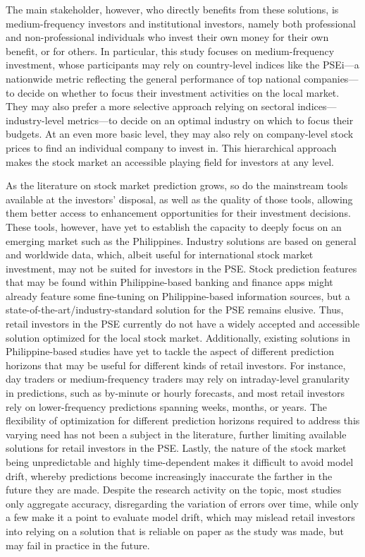 \documentclass[stu,floatsintext]{apa7}
\begin{document}
The main stakeholder, however, who directly benefits from these solutions, is medium-frequency investors and institutional investors, namely both professional and non-professional individuals who invest their own money for their own benefit, or for others. In particular, this study focuses on medium-frequency investment, whose participants may rely on country-level indices like the PSEi—a nationwide metric reflecting the general performance of top national companies—to decide on whether to focus their investment activities on the local market. They may also prefer a more selective approach relying on sectoral indices—industry-level metrics—to decide on an optimal industry on which to focus their budgets. At an even more basic level, they may also rely on company-level stock prices to find an individual company to invest in. This hierarchical approach makes the stock market an accessible playing field for investors at any level.

As the literature on stock market prediction grows, so do the mainstream tools available at the investors’ disposal, as well as the quality of those tools, allowing them better access to enhancement opportunities for their investment decisions. These tools, however, have yet to establish the capacity to deeply focus on an emerging market such as the Philippines. Industry solutions are based on general and worldwide data, which, albeit useful for international stock market investment, may not be suited for investors in the PSE. Stock prediction features that may be found within Philippine-based banking and finance apps might already feature some fine-tuning on Philippine-based information sources, but a state-of-the-art/industry-standard solution for the PSE remains elusive. Thus, retail investors in the PSE currently do not have a widely accepted and accessible solution optimized for the local stock market. Additionally, existing solutions in Philippine-based studies have yet to tackle the aspect of different prediction horizons that may be useful for different kinds of retail investors. For instance, day traders or medium-frequency traders may rely on intraday-level granularity in predictions, such as by-minute or hourly forecasts, and most retail investors rely on lower-frequency predictions spanning weeks, months, or years. The flexibility of optimization for different prediction horizons required to address this varying need has not been a subject in the literature, further limiting available solutions for retail investors in the PSE. Lastly, the nature of the stock market being unpredictable and highly time-dependent makes it difficult to avoid model drift, whereby predictions become increasingly inaccurate the farther in the future they are made. Despite the research activity on the topic, most studies only aggregate accuracy, disregarding the variation of errors over time, while only a few make it a point to evaluate model drift, which may mislead retail investors into relying on a solution that is reliable on paper as the study was made, but may fail in practice in the future.
\end{document}

